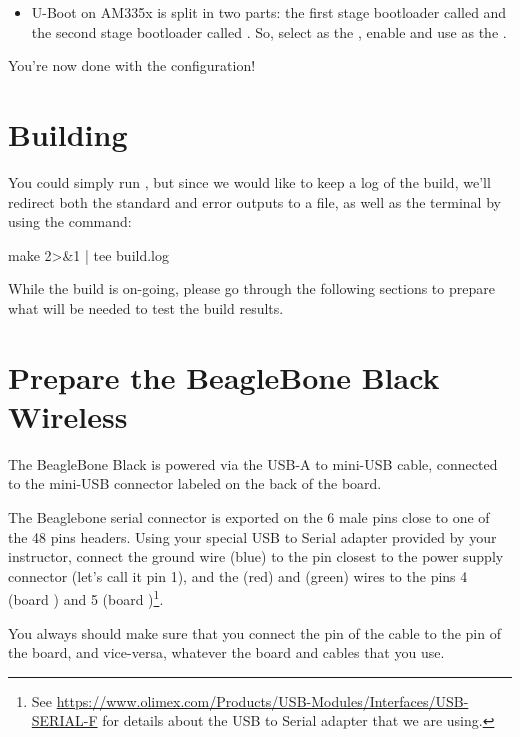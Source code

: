 \begin{itemize}
\begin{itemize}
  \item U-Boot on AM335x is split in two parts: the first stage
    bootloader called  and the second stage bootloader
    called . So, select  as the
    , enable  and use  as the .

  \end{itemize}

\end{itemize}

You're now done with the configuration!

\section{Building}

You could simply run , but since we would like to keep a
log of the build, we'll redirect both the standard and error outputs
to a file, as well as the terminal by using the  command:

\begin{bashinput}
make 2>&1 | tee build.log
\end{bashinput}

While the build is on-going, please go through the following sections
to prepare what will be needed to test the build results.

\section{Prepare the BeagleBone Black Wireless}

The BeagleBone Black is powered via the USB-A to mini-USB cable,
connected to the mini-USB connector labeled  on the back of
the board.

The Beaglebone serial connector is exported on the 6 male pins close
to one of the 48 pins headers. Using your special USB to Serial
adapter provided by your instructor, connect the ground wire (blue) to
the pin closest to the power supply connector (let's call it pin 1),
and the  (red) and  (green) wires to the pins 4
(board ) and 5 (board )\footnote{See
  \url{https://www.olimex.com/Products/USB-Modules/Interfaces/USB-SERIAL-F}
  for details about the USB to Serial adapter that we are using.}.

You always should make sure that you connect the  pin of the
cable to the  pin of the board, and vice-versa, whatever the
board and cables that you use.

